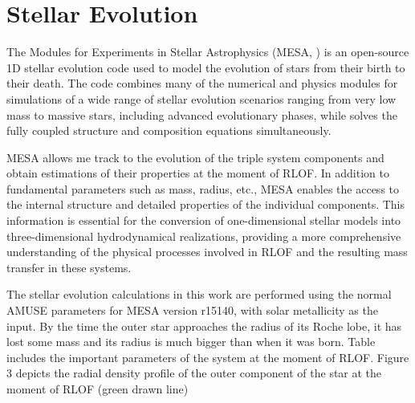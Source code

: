\section{Stellar Evolution}

The Modules for Experiments in Stellar Astrophysics (MESA, \cite{paxton2010modules,paxton2013modules,paxton2015modules,paxton2019modules}) is an open-source 1D stellar evolution code used to model the evolution of stars from their birth to their death. The code combines many of the numerical and physics modules for simulations of a wide range of stellar evolution scenarios ranging from very low mass to massive stars, including advanced evolutionary phases, while solves the fully coupled structure and composition equations simultaneously. 

MESA allows me track to the evolution of the triple system components and obtain estimations of their properties at the moment of RLOF. In addition to fundamental parameters such as mass, radius, etc., MESA enables the access to the internal structure and detailed properties of the individual components. This information is essential for the conversion of one-dimensional stellar models into three-dimensional hydrodynamical realizations, providing a more comprehensive understanding of the physical processes involved in RLOF and the resulting mass transfer in these systems.

The stellar evolution calculations in this work are performed using the normal AMUSE parameters for MESA version r15140, with solar metallicity as the input. By the time the outer star approaches the radius of its Roche lobe, it has lost some mass and its radius is much bigger than when it was born. Table includes the important parameters of the system at the moment of RLOF. Figure 3 depicts the radial density profile of the outer component of the star at the moment of RLOF (green drawn line)



